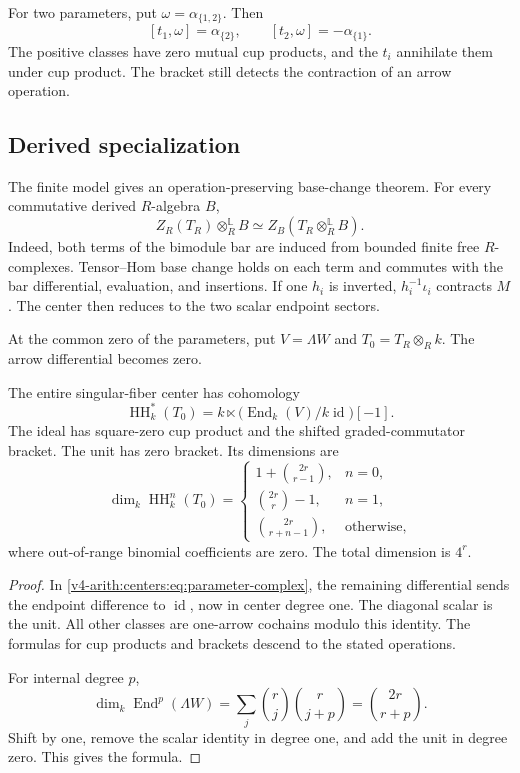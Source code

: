 For two parameters, put
$\omega=\alpha_{\{1,2\}}$. Then
\[
 [t_1,\omega]=\alpha_{\{2\}},\qquad
 [t_2,\omega]=-\alpha_{\{1\}}.
\]
The positive classes have zero mutual
cup products, and the $t_i$ annihilate
them under cup product. The bracket still
detects the contraction of an arrow
operation.

\subsection{Derived specialization}
\label{v4-arith:centers:subsec:specialization}

The finite model gives an operation-preserving
base-change theorem. For every commutative
derived $R$-algebra $B$,
\begin{equation}\label{v4-arith:centers:eq:parameter-base}
 Z_R(T_R)\otimes_R^{\mathbb L}B
 \simeq
 Z_B(T_R\otimes_R^{\mathbb L}B).
\end{equation}
Indeed, both terms of the bimodule bar are
induced from bounded finite free
$R$-complexes. Tensor--Hom base change
holds on each term and commutes with
the bar differential, evaluation, and
insertions. If one $h_i$ is inverted,
$h_i^{-1}\iota_i$ contracts $M$. The
center then reduces to the two scalar
endpoint sectors.

At the common zero of the parameters,
put $V=\Lambda W$ and $T_0=T_R\otimes_R k$.
The arrow differential becomes zero.

\begin{theorem}\label{v4-arith:centers:thm:singular-fiber}
The entire singular-fiber center has
cohomology
\[
 \operatorname{HH}^*_k(T_0)
 =
 k\ltimes
 \bigl(\operatorname{End}_k(V)/k\operatorname{id}\bigr)[-1].
\]
The ideal has square-zero cup product and
the shifted graded-commutator bracket.
The unit has zero bracket. Its dimensions
are
\[
 \dim_k\operatorname{HH}^n_k(T_0)=
 \begin{cases}
 1+\binom{2r}{r-1},&n=0,\\
 \binom{2r}{r}-1,&n=1,\\
 \binom{2r}{r+n-1},&\text{otherwise},
 \end{cases}
\]
where out-of-range binomial coefficients
are zero. The total dimension is $4^r$.
\end{theorem}

\begin{proof}
In \eqref{v4-arith:centers:eq:parameter-complex},
the remaining differential sends the
endpoint difference to $\operatorname{id}$,
now in center degree one. The diagonal
scalar is the unit. All other classes
are one-arrow cochains modulo this
identity. The formulas for cup products
and brackets descend to the stated
operations.

For internal degree $p$,
\[
 \dim_k\operatorname{End}^p(\Lambda W)
 =\sum_j\binom rj\binom r{j+p}
 =\binom{2r}{r+p}.
\]
Shift by one, remove the scalar identity
in degree one, and add the unit in
degree zero. This gives the formula.
\end{proof}

